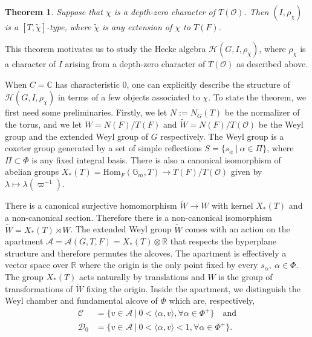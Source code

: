 \documentclass{article}
\newcommand{\Hom}{\mathrm{Hom}}
\newcommand{\cO}{\mathcal{O}}
\newcommand{\cH}{\mathcal{H}}
\newcommand{\CC}{\mathbb{C}}
\newcommand{\RR}{\mathbb{R}}
\newcommand{\GG}{\mathbb{G}}
\theoremstyle{plain}
\newtheorem{theorem}{Theorem}[section]
\theoremstyle{definition}
\begin{document}
    \begin{theorem}
        Suppose that $\chi$ is a depth-zero character of $T(\cO)$. Then $(I,\rho_\chi)$ is a $[T,\tilde\chi]$-type, where $\tilde\chi$ is any extension of $\chi$ to $T(F)$.
    \end{theorem}

    This theorem motivates us to study the Hecke algebra $\cH(G,I,\rho_\chi)$, where $\rho_\chi$ is a character of $I$ arising from a depth-zero character of $T(\cO)$ as described above. 

    When $C=\CC$ has characteristic $0$, one can explicitly describe the structure of $\cH(G,I,\rho_{\chi})$ in terms of a few objects associated to $\chi$. To state the theorem, we first need some preliminaries. Firstly, we let $N:=N_G(T)$ be the normalizer of the torus, and we let $W=N(F)/T(F)$ and $\tilde{W}=N(F)/T(\cO)$ be the Weyl group and the extended Weyl group of $G$ respectively. The Weyl group is a coxeter group generated by a set of simple reflections $S=\{s_\alpha\ |\ \alpha\in\Pi\}$, where $\Pi\subset\Phi$ is any fixed integral basis. There is also a canonical isomorphism of abelian groups $X_*(T)=\Hom_F(\GG_m,T)\longrightarrow T(F)/T(\cO)$ given by $\lambda\mapsto\lambda(\varpi^{-1})$.
    
    There is a canonical surjective homomorphism $\tilde{W}\rightarrow W$ with kernel $X_*(T)$ and a non-canonical section. Therefore there is a non-canonical isomorphism $\tilde{W}=X_*(T)\rtimes W$. The extended Weyl group $\tilde{W}$ comes with an action on the apartment $\mathcal{A}=\mathcal{A}(G,T,F)=X_*(T)\otimes\RR$ that respects the hyperplane structure and therefore permutes the alcoves. The apartment is effectively a vector space over $\RR$ where the origin is the only point fixed by every $s_\alpha,\ \alpha\in\Phi$. The group $X_*(T)$ acts naturally by translations and $W$ is the group of transformations of $\tilde{W}$ fixing the origin. Inside the apartment, we distinguish the Weyl chamber and fundamental alcove of $\Phi$ which are, respectively,
    \begin{align*}
        \mathcal{C}&=\{v\in\mathcal{A}\ |\ 0<\langle\alpha,v\rangle,\forall\alpha\in\Phi^+\}\quad\text{and}\\
        \mathcal{D}_0&=\{v\in\mathcal{A}\ |\ 0<\langle\alpha,v\rangle<1,\forall\alpha\in\Phi^+\}.
    \end{align*}
\end{document}
